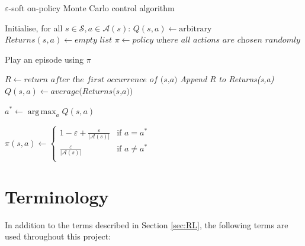 \documentclass[11pt,a4paper]{report}
\newcommand{\argmax}{\mathop{\mathrm{arg\,max}}}
\begin{document}
\begin{algorithm}
    \caption{$\varepsilon$-soft on-policy Monte Carlo control algorithm} \label{sec:monteCarloPseudocode}
    \begin{algorithmic}[1]
        
        \State Initialise, for all $s \in \mathcal{S}, a \in \mathcal{A}(s)$:
            \State\hspace{\algorithmicindent} $Q(s,a) \gets \text{arbitrary}$
            \State\hspace{\algorithmicindent} $Returns(s,a) \gets \textit{empty list}$
            \State\hspace{\algorithmicindent} $\pi \gets \textit{policy where all actions are chosen randomly}$
        
            \State Play an episode using $\pi$
            
                 \State $R \gets \textit{return after the first occurrence of (s,a)}$
                 \State \textit{Append R to Returns(s,a)}
                 \State $Q(s,a) \gets average\textit{(Returns(s,a))}$
            \EndFor
            
                \State $a^{\ast} \gets \argmax_a Q(s,a)$
                
                    \State $\pi(s,a) \gets
                        \begin{cases}
                            1 - \varepsilon + \frac{\varepsilon}{|\mathcal{A}(s)|} & \text{if } a = a^{\ast} \\
                            \frac{\varepsilon}{|\mathcal{A}(s)|}  & \text{if } a \neq a^{\ast} \\
                        \end{cases}$
                \EndFor
            \EndFor
        \EndFor
        \EndProcedure
    \end{algorithmic}
\end{algorithm}


\section{Terminology}
\label{sec:Terminology}

In addition to the terms described in Section \ref{sec:RL}, the following terms are used throughout this project:
\end{document}
